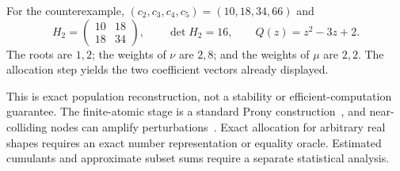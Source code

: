 \documentclass[11pt]{article}
\theoremstyle{definition}\newtheorem{definition}[theorem]{Definition}
\theoremstyle{remark}\newtheorem{remark}[theorem]{Remark}
\begin{document}
For the counterexample, $(c_2,c_3,c_4,c_5)=(10,18,34,66)$ and
\[
 H_2=\begin{pmatrix}10&18\\18&34\end{pmatrix},\qquad
 \det H_2=16,\qquad Q(z)=z^2-3z+2.
\]
The roots are $1,2$; the weights of $\nu$ are $2,8$; and the weights of $\mu$ are $2,2$. The allocation step yields the two coefficient vectors already displayed.

This is exact population reconstruction, not a stability or efficient-computation guarantee. The finite-atomic stage is a standard Prony construction~\cite{KPR}, and near-colliding nodes can amplify perturbations~\cite{AGY}. Exact allocation for arbitrary real shapes requires an exact number representation or equality oracle. Estimated cumulants and approximate subset sums require a separate statistical analysis.
\end{document}
